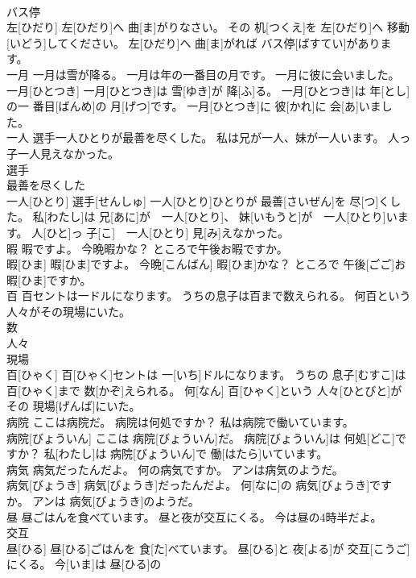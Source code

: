\documentclass[8pt]{extreport}
\begin{document}
\begin{CJK}{UTF8}{min}
\\	バス停 
\\	左[ひだり] 左[ひだり]へ 曲[ま]がりなさい。 その 机[つくえ]を 左[ひだり]へ 移動[いどう]してください。 左[ひだり]へ 曲[ま]がれば バス停[ばすてい]があります。
\\	一月 一月は雪が降る。 一月は年の一番目の月です。 一月に彼に会いました。	
\\	一月[ひとつき] 一月[ひとつき]は 雪[ゆき]が 降[ふ]る。 一月[ひとつき]は 年[とし]の一 番目[ばんめ]の 月[げつ]です。 一月[ひとつき]に 彼[かれ]に 会[あ]いました。
\\	一人 選手一人ひとりが最善を尽くした。 私は兄が一人、妹が一人います。 人っ子一人見えなかった。	
\\	選手 
\\	最善を尽くした 
\\	一人[ひとり] 選手[せんしゅ] 一人[ひとり]ひとりが 最善[さいぜん]を 尽[つ]くした。 私[わたし]は 兄[あに]が　一人[ひとり]、 妹[いもうと]が　一人[ひとり]います。 人[ひと]っ 子[こ]　一人[ひとり] 見[み]えなかった。
\\	暇 暇ですよ。 今晩暇かな？ ところで午後お暇ですか。	
\\	暇[ひま] 暇[ひま]ですよ。 今晩[こんばん] 暇[ひま]かな？ ところで 午後[ごご]お 暇[ひま]ですか。
\\	百 百セントは一ドルになります。 うちの息子は百まで数えられる。 何百という人々がその現場にいた。	
\\	数 
\\	人々 
\\	現場 
\\	百[ひゃく] 百[ひゃく]セントは 一[いち]ドルになります。 うちの 息子[むすこ]は 百[ひゃく]まで 数[かぞ]えられる。 何[なん] 百[ひゃく]という 人々[ひとびと]がその 現場[げんば]にいた。
\\	病院 ここは病院だ。 病院は何処ですか？ 私は病院で働いています。	
\\	病院[びょういん] ここは 病院[びょういん]だ。 病院[びょういん]は 何処[どこ]ですか？ 私[わたし]は 病院[びょういん]で 働[はたら]いています。
\\	病気 病気だったんだよ。 何の病気ですか。 アンは病気のようだ。	
\\	病気[びょうき] 病気[びょうき]だったんだよ。 何[なに]の 病気[びょうき]ですか。 アンは 病気[びょうき]のようだ。
\\	昼 昼ごはんを食べています。 昼と夜が交互にくる。 今は昼の4時半だよ。	
\\	交互 
\\	昼[ひる] 昼[ひる]ごはんを 食[た]べています。 昼[ひる]と 夜[よる]が 交互[こうご]にくる。 今[いま]は 昼[ひる]の 

\end{CJK}
\end{document}
